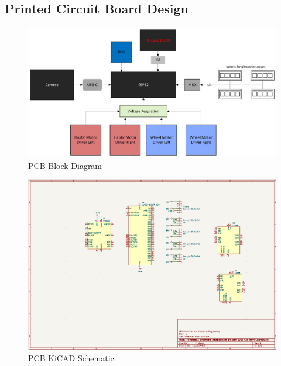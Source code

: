 \subsection{Printed Circuit Board Design} \label{sec:pcb-design}
\begin{figure}[H]
	\centering
	\includegraphics[width=\textwidth]{./Images/PCB-Block-Diagram.png}
	\caption{\label{fig:pcb}PCB Block Diagram}
\end{figure}

\begin{figure}[H]
	\centering
	\includegraphics[width=\textwidth]{./Images/PCB-sch.png}
	\caption{\label{fig:pcb-sch}PCB KiCAD Schematic}
\end{figure}